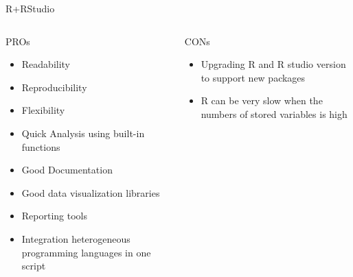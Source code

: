 \documentclass[aspectratio=169,10pt]{beamer}
\begin{document}
\begin{frame}[fragile]{R+RStudio}
\begin{columns}
\begin{column}{0.5\textwidth}
 \begin{alertblock}{PROs}
\begin{itemize}
    \item Readability
    \item Reproducibility 
     \item Flexibility
    \item Quick Analysis using built-in functions
   \item  Good Documentation
\item  Good data visualization libraries 
\item  Reporting tools  
\item Integration heterogeneous programming languages in one script 
\end{itemize}
\end{alertblock}
\end{column}
\begin{column}{0.5\textwidth}
 \begin{alertblock}{CONs}
\begin{itemize}
    \item Upgrading  R and R studio version to support new packages
      \item R  can be very slow when the numbers of stored variables is high

   

\end{itemize}
\end{alertblock}
\end{column}
\end{columns}
\end{frame}
\end{document}
